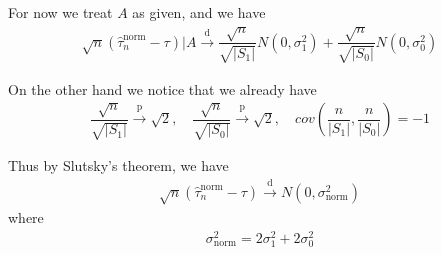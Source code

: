 \documentclass[11pt,a4paper]{ctexart}
\numberwithin{equation}{section}%
\begin{document}
For now we treat $ A $ as given, and we have
\begin{align*}
    \sqrt{n}(\hat{\tau}_n^\mathrm{ norm } -\tau)\big| A \xrightarrow[]{\mathrm{d}} \dfrac{ \sqrt{n} }{ \sqrt{\left\vert S_1 \right\vert } } N(0, \sigma _1^2) + \dfrac{ \sqrt{n} }{ \sqrt{\left\vert S_0 \right\vert } } N(0, \sigma _0^2)
\end{align*}

On the other hand we notice that we already have
\begin{align*}
    \dfrac{ \sqrt{n} }{ \sqrt{\left\vert S_1 \right\vert } } \xrightarrow[]{\mathrm{p}} \sqrt{2},\quad \dfrac{ \sqrt{n} }{ \sqrt{\left\vert S_0 \right\vert } } \xrightarrow[]{\mathrm{p}} \sqrt{2},\quad cov\left( \dfrac{ n }{ \left\vert S_1 \right\vert }, \dfrac{ n }{ \left\vert S_0 \right\vert } \right) = -1
\end{align*}

Thus by Slutsky's theorem, we have
\begin{align*}
    \sqrt{n}(\hat{\tau}_n^\mathrm{ norm } -\tau) \xrightarrow[]{\mathrm{d}}N(0, \sigma ^2_\mathrm{ norm }) 
\end{align*}
where
\begin{align*}
    \sigma ^2_\mathrm{ norm } = 2\sigma _1^2 + 2\sigma _0^2 
\end{align*}








\end{document}
